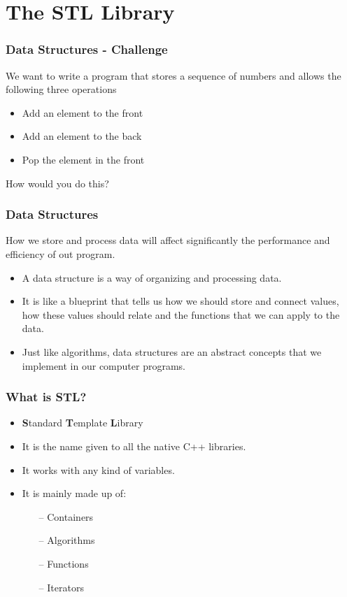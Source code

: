 \documentclass{beamer}
\begin{document}
\section{The STL Library}

\begin{frame}
    \frametitle{Data Structures - Challenge}

	We want to write a program that stores a sequence of numbers and allows the following three operations

    \begin{itemize}
        \item Add an element to the front
        \item Add an element to the back
		\item Pop the element in the front
    \end{itemize}

	How would you do this?
\end{frame}

\begin{frame}
    \frametitle{Data Structures}

	\begin{center}
		How we store and process data will  affect significantly the performance and efficiency of out program.
	\end{center}

    \begin{itemize}
        \item A data structure is a way of organizing and processing data.
        \item It is like a blueprint that tells us how we should store and connect values, how these values should relate and the functions that we can apply to the data.
		\item Just like algorithms, data structures are an abstract concepts that we implement in our computer programs.
    \end{itemize}
\end{frame}

\begin{frame}
    \frametitle{What is \textbf{STL}?}

    \begin{itemize}
        \item \textbf{S}tandard \textbf{T}emplate \textbf{L}ibrary
        \item It is the name given to all the native C++ libraries.
        \item It works with any kind of variables.
        \item It is mainly made up of:
            \begin{itemize}
                \item[--] Containers
                \item[--] Algorithms
                \item[--] Functions
                \item[--] Iterators
            \end{itemize}
    \end{itemize}
\end{frame}
\end{document}

